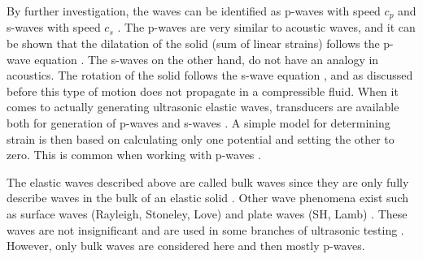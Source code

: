 \documentclass[11pt,twoside]{eitExjobb}
\begin{document}
	By further investigation, the waves can be identified as p-waves with speed $c_p$ and s-waves with speed $c_s$ \cite{Schmerr2016}. The p-waves are very similar to acoustic waves, and it can be shown that the dilatation of the solid (sum of linear strains) follows the p-wave equation \cite{Schmerr2016}. The s-waves on the other hand, do not have an analogy in acoustics. The rotation of the solid follows the s-wave equation \cite{Schmerr2016}, and as discussed before this type of motion does not propagate in a compressible fluid. When it comes to actually generating ultrasonic elastic waves, transducers are available both for generation of p-waves and s-waves \cite{Schmerr2016}. A simple model for determining strain is then based on calculating only one potential and setting the other to zero. This is common when working with p-waves \cite{Kaufman2000}.
	
	The elastic waves described above are called bulk waves since they are only fully describe waves in the bulk of an elastic solid \cite{Kaufman2005}. Other wave phenomena exist such as surface waves (Rayleigh, Stoneley, Love) \cite{Kaufman2005} and plate waves (SH, Lamb) \cite{Schmerr2016}. These waves are not insignificant and are used in some branches of ultrasonic testing \cite{Schmerr2016}. However, only bulk waves are considered here and then mostly p-waves.
	
	
\end{document}
